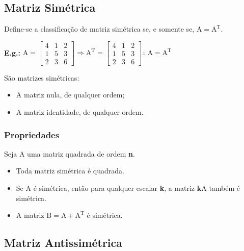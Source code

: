\documentclass[a4paper,12pt]{article}
\begin{document}
\subsection{Matriz Simétrica}

Define-se a classificação de matriz simétrica se, e somente se, $ \text{A} = \text{A}^{\text{T}} $.

\textbf{E.g.:} $ \text{A} =  \begin{bmatrix}
4 & 1 & 2 \\
1 & 5 & 3 \\
2 & 3 & 6
\end{bmatrix} \Rightarrow  \text{A}^{\text{T}} =  \begin{bmatrix}
4 & 1 & 2 \\
1 & 5 & 3 \\
2 & 3 & 6
\end{bmatrix}  \therefore \  \text{A} = \text{A}^{\text{T}} $

São matrizes simétricas:

\begin{itemize}

\item A matriz nula, de qualquer ordem;

\item A matriz identidade, de qualquer ordem.

\end{itemize}

\subsubsection{Propriedades}

Seja $\text{A}$ uma matriz quadrada de ordem \textbf{n}.

\begin{itemize}

\item Toda matriz simétrica é quadrada.

\item Se $\text{A}$ é simétrica, então para qualquer escalar \textbf{k}, a matriz $\textbf{k}\text{A}$ também é simétrica.

\item A matriz $\text{B} = \text{A} + \text{A}^\text{T}$ é simétrica.

\end{itemize}

\subsection{Matriz Antissimétrica}
\end{document}
